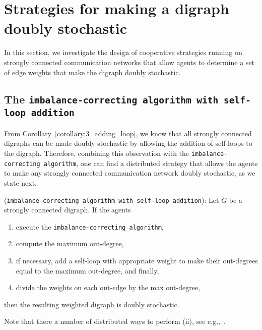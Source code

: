 \documentclass[final]{siamltex}
\begin{document}
\section{Strategies for making a digraph doubly
  stochastic}\label{section:ds_dist}

In this section, we investigate the design of cooperative strategies
running on strongly connected communication networks that allow agents
to determine a set of edge weights that make the digraph doubly
stochastic.

\subsection{The {\texttt{imbalance-correcting algorithm with
    self-loop addition}\xspace}}\label{subsection:dis_ds_self-loop}
From Corollary~\ref{corollary:3_adding_loop}, we know that all
strongly connected digraphs can be made doubly stochastic by allowing
the addition of self-loops to the digraph.  Therefore, combining this
observation with the {\texttt{imbalance-correcting algorithm}\xspace}, one can find a distributed strategy that
allows the agents to make any strongly connected communication network
doubly stochastic, as we state next.

\begin{theorem}{\mbox{}\textup{({\texttt{imbalance-correcting algorithm with
    self-loop addition}\xspace}):}}
  Let $ G$ be a strongly connected digraph. If the agents
  \begin{enumerate}
  \item execute the {\texttt{imbalance-correcting algorithm}\xspace},
  \item compute the maximum out-degree,
  \item if necessary, add a self-loop with appropriate weight to make
    their out-degrees equal to the maximum out-degree, and finally,
  \item divide the weights on each out-edge by the max out-degree,
  \end{enumerate}
  then the resulting weighted digraph is doubly stochastic.
\end{theorem}

Note that there a number of distributed ways to perform (ii), see
e.g.,~\cite{NAL:97,DP:00}.
\end{document}
